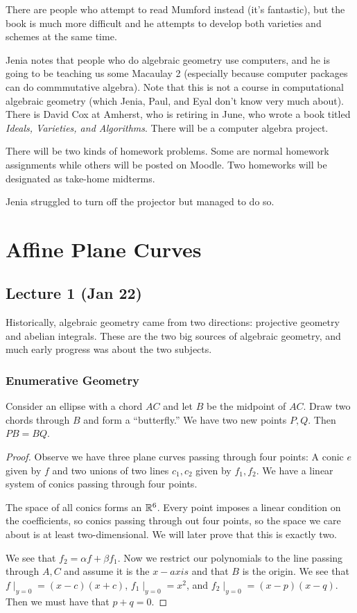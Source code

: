 \documentclass[twoside, 10pt]{article}
\begin{document}
    There are people who attempt to read Mumford instead (it's fantastic), but the book is much more difficult and he attempts to develop both varieties and schemes at the same time.

    Jenia notes that people who do algebraic geometry use computers, and he is going to be teaching us some Macaulay 2 (especially because computer packages can do commmutative algebra). Note that this is not a course in computational algebraic geometry (which Jenia, Paul, and Eyal don't know very much about). There is David Cox at Amherst, who is retiring in June, who wrote a book titled \emph{Ideals, Varieties, and Algorithms}. There will be a computer algebra project.

    There will be two kinds of homework problems. Some are normal homework assignments while others will be posted on Moodle. Two homeworks will be designated as take-home midterms.

    Jenia struggled to turn off the projector but managed to do so.

    \section{Affine Plane Curves}

    \subsection{Lecture 1 (Jan 22)}
    Historically, algebraic geometry came from two directions: projective geometry and abelian integrals. These are the two big sources of algebraic geometry, and much early progress was about the two subjects.

    \subsubsection{Enumerative Geometry}

    \begin{thm}
        Consider an ellipse with a chord $AC$ and let $B$ be the midpoint of $AC$. Draw two chords through $B$ and form a ``butterfly.'' We have two new points $P,Q$. Then $PB=BQ$.

        \begin{proof}
            Observe we have three plane curves passing through four points: A conic $e$ given by $f$ and two unions of two lines $c_1,c_2$ given by $f_1,f_2$. We have a linear system of conics passing through four points. 

            The space of all conics forms an $\mathbb{R}^6$. Every point imposes a linear condition on the coefficients, so conics passing through out four points, so the space we care about is at least two-dimensional. We will later prove that this is exactly two.

            We see that $f_2 = \alpha f + \beta f_1$. Now we restrict our polynomials to the line passing through $A,C$ and assume it is the $x-axis$ and that $B$ is the origin. We see that $f \mid_{y=0} = (x-c)(x+c)$, $f_1 \mid_{y=0} = x^2$, and $f_2 \mid_{y=0} = (x-p)(x-q)$. Then we must have that $p+q=0$.
        \end{proof}
    \end{thm}
\end{document}

